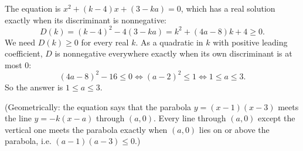 The equation is $x^2+(k-4)x+(3-ka)=0$, which has a real solution exactly when its discriminant is nonnegative:
\[D(k)=(k-4)^2-4(3-ka)=k^2+(4a-8)k+4\ge0.\]
We need $D(k)\ge0$ for every real $k$. As a quadratic in $k$ with positive leading coefficient, $D$ is nonnegative everywhere exactly when its own discriminant is at most $0$:
\[(4a-8)^2-16\le0\iff(a-2)^2\le1\iff1\le a\le3.\]
So the answer is $\boxed{1\le a\le3}$.

(Geometrically: the equation says that the parabola $y=(x-1)(x-3)$ meets the line $y=-k(x-a)$ through $(a,0)$. Every line through $(a,0)$ except the vertical one meets the parabola exactly when $(a,0)$ lies on or above the parabola, i.e. $(a-1)(a-3)\le0$.)

